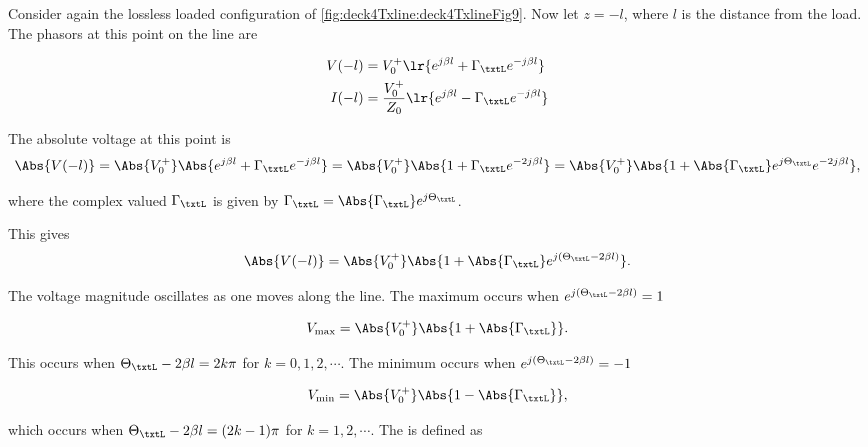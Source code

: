 Consider again the lossless loaded configuration of \cref{fig:deck4Txline:deck4TxlineFig9}.  Now let \( z = - l \), where \( l \) is the distance from the load.  The phasors at this point on the line are

\begin{equation}\label{eqn:uwaves4TransmissionLines:1100}
\begin{aligned}
V(-l) &= V_0^{+} \lr{ e^{j \beta l} + \Gamma_\txtL e^{-j \beta l} } \\
I(-l) &= \frac{V_0^{+}}{Z_0} \lr{ e^{j \beta l} - \Gamma_\txtL  e^{-j \beta l} } \\
\end{aligned}
\end{equation}

The absolute voltage at this point is
\begin{dmath}\label{eqn:uwaves4TransmissionLines:1120}
\Abs{V(-l)}
= \Abs{V_0^{+}} \Abs{ e^{j \beta l} + \Gamma_\txtL e^{-j \beta l} }
= \Abs{V_0^{+}} \Abs{ 1 + \Gamma_\txtL e^{-2 j \beta l} }
= \Abs{V_0^{+}} \Abs{ 1 + \Abs{\Gamma_\txtL} e^{j \Theta_\txtL} e^{-2 j \beta l} },
\end{dmath}

where the complex valued \( \Gamma_\txtL \) is given by \( \Gamma_\txtL = \Abs{\Gamma_\txtL} e^{j \Theta_\txtL} \).

This gives
\begin{equation}\label{eqn:uwaves4TransmissionLines:1140}
\Abs{V(-l)}
= \Abs{V_0^{+}} \Abs{ 1 + \Abs{\Gamma_\txtL} e^{j(\Theta_\txtL -2 \beta l)} }.
\end{equation}

The voltage magnitude oscillates as one moves along the line.  The maximum occurs when \( e^{j (\Theta_\txtL -2 \beta l)}  = 1 \)

\begin{equation}\label{eqn:uwaves4TransmissionLines:1160}
V_{\mathrm{max}} = \Abs{V_0^{+}} \Abs{ 1 + \Abs{\Gamma_\txtL} }.
\end{equation}

This occurs when \( \Theta_\txtL - 2 \beta l = 2 k \pi \) for \( k = 0, 1, 2, \cdots \).  The minimum occurs when \( e^{j (\Theta_\txtL -2 \beta l)}  = -1 \)

\begin{equation}\label{eqn:uwaves4TransmissionLines:1180}
V_{\mathrm{min}} = \Abs{V_0^{+}} \Abs{ 1 - \Abs{\Gamma_\txtL} },
\end{equation}

which occurs when \( \Theta_\txtL - 2 \beta l = (2 k - 1 )\pi \) for \( k = 1, 2, \cdots \).  The  is defined as

